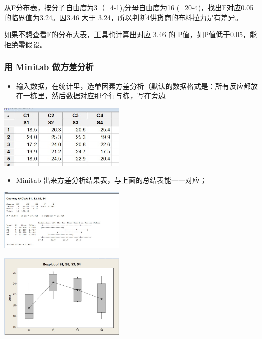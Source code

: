 从F分布表，按分子自由度为3（=4-1),分母自由度为16 (=20-4)，找出F对应0.05
的临界值为3.24。因3.46 大于 3.24，所以判断4供货商的布料拉力是有差异。

如果不想查看F的分布大表，工具也计算出对应 3.46 的
P值，如P值低于0.05，能拒绝零假设。

\hypertarget{ux7528-minitab-ux505aux65b9ux5deeux5206ux6790}{%
\subsubsection{用 Minitab
做方差分析}\label{ux7528-minitab-ux505aux65b9ux5deeux5206ux6790}}

\begin{itemize}
\tightlist
\item
  输入数据，在统计里，选单因素方差分析（默认的数据格式是：所有反应都放在一栋里，然后数据对应那个行与栋，写在旁边
\end{itemize}


\includegraphics[width=6cm]{AnovaSuppliersDataScreenshot_2022-08-07_125537.jpg}

\begin{itemize}
\tightlist
\item
  Minitab 出来方差分析结果表，与上面的总结表能一一对应；
\end{itemize}


\includegraphics[width=6cm]{AnovaParachutes807Screenshot_2022-08-07_124737.jpg}


\includegraphics[width=6cm]{AnovaBoxplots807.jpg}

